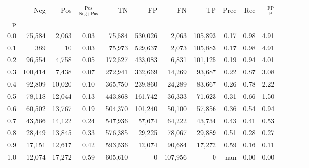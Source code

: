 \begin{tabular}{rrrcrrrrrrrrrrr}
\toprule
{} &      Neg &     Pos & $\frac{\text{Pos}}{\text{Neg}+\text{Pos}}$ &       TN &       FP &       FN &       TP &  Prec &   Rec & $\frac{\text{FP}}{\text{P}}$ \\
p   &          &         &                                            &          &          &          &          &       &       &                              \\
\midrule
0.0 &   75,584 &   2,063 &                                       0.03 &   75,584 &  530,026 &    2,063 &  105,893 &  0.17 &  0.98 &                         4.91 \\
0.1 &      389 &      10 &                                       0.03 &   75,973 &  529,637 &    2,073 &  105,883 &  0.17 &  0.98 &                         4.91 \\
0.2 &   96,554 &   4,758 &                                       0.05 &  172,527 &  433,083 &    6,831 &  101,125 &  0.19 &  0.94 &                         4.01 \\
0.3 &  100,414 &   7,438 &                                       0.07 &  272,941 &  332,669 &   14,269 &   93,687 &  0.22 &  0.87 &                         3.08 \\
0.4 &   92,809 &  10,020 &                                       0.10 &  365,750 &  239,860 &   24,289 &   83,667 &  0.26 &  0.78 &                         2.22 \\
0.5 &   78,118 &  12,044 &                                       0.13 &  443,868 &  161,742 &   36,333 &   71,623 &  0.31 &  0.66 &                         1.50 \\
0.6 &   60,502 &  13,767 &                                       0.19 &  504,370 &  101,240 &   50,100 &   57,856 &  0.36 &  0.54 &                         0.94 \\
0.7 &   43,566 &  14,122 &                                       0.24 &  547,936 &   57,674 &   64,222 &   43,734 &  0.43 &  0.41 &                         0.53 \\
0.8 &   28,449 &  13,845 &                                       0.33 &  576,385 &   29,225 &   78,067 &   29,889 &  0.51 &  0.28 &                         0.27 \\
0.9 &   17,151 &  12,617 &                                       0.42 &  593,536 &   12,074 &   90,684 &   17,272 &  0.59 &  0.16 &                         0.11 \\
1.0 &   12,074 &  17,272 &                                       0.59 &  605,610 &        0 &  107,956 &        0 &   nan &  0.00 &                         0.00 \\
\bottomrule
\end{tabular}
